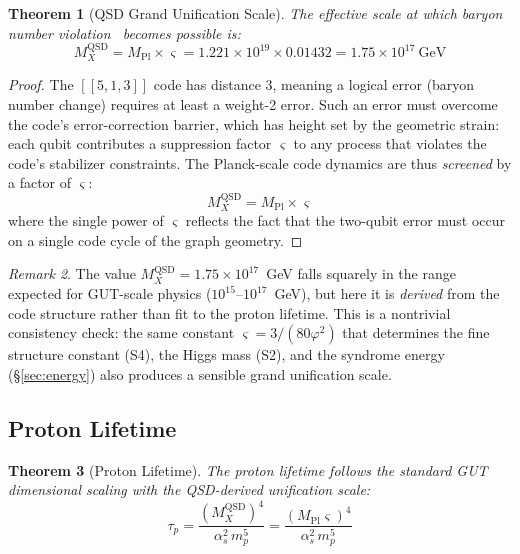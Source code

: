 \documentclass[11pt,a4paper]{article}
\newtheorem{theorem}{Theorem}[section]
\theoremstyle{definition}
\theoremstyle{remark}
\newtheorem{remark}[theorem]{Remark}
\newcommand{\strain}{\varsigma}
\newcommand{\gr}{\varphi}
\newcommand{\Mpl}{M_{\mathrm{Pl}}}
\newcommand{\MX}{{M_X^{\mathrm{QSD}}}}
\begin{document}
\begin{theorem}[QSD Grand Unification Scale]
\label{thm:MX}
The effective scale at which baryon number violation~\cite{GeorgiGlashow1974} becomes possible is:
\begin{equation}
\boxed{\MX = \Mpl \times \strain = 1.221 \times 10^{19} \times 0.01432 = 1.75 \times 10^{17}~\text{GeV}}
\end{equation}
\end{theorem}

\begin{proof}
The $[[5,1,3]]$ code has distance 3, meaning a logical error (baryon number change) requires at least a weight-2 error. Such an error must overcome the code's error-correction barrier, which has height set by the geometric strain: each qubit contributes a suppression factor $\strain$ to any process that violates the code's stabilizer constraints. The Planck-scale code dynamics are thus \emph{screened} by a factor of $\strain$:
\begin{equation}
\MX = \Mpl \times \strain
\end{equation}
where the single power of $\strain$ reflects the fact that the two-qubit error must occur on a single code cycle of the graph geometry.
\end{proof}

\begin{remark}
The value $\MX = 1.75 \times 10^{17}$~GeV falls squarely in the range expected for GUT-scale physics ($10^{15}$--$10^{17}$~GeV), but here it is \emph{derived} from the code structure rather than fit to the proton lifetime. This is a nontrivial consistency check: the same constant $\strain = 3/(80\gr^2)$ that determines the fine structure constant (S4), the Higgs mass (S2), and the syndrome energy (\S\ref{sec:energy}) also produces a sensible grand unification scale.
\end{remark}

\subsection{Proton Lifetime}

\begin{theorem}[Proton Lifetime]
\label{thm:proton}
The proton lifetime follows the standard GUT dimensional scaling with the QSD-derived unification scale:
\begin{equation}
\boxed{\tau_p = \frac{(\MX)^4}{\alpha_s^2\, m_p^5} = \frac{(\Mpl\strain)^4}{\alpha_s^2\, m_p^5}}
\end{equation}
\end{theorem}
\end{document}
